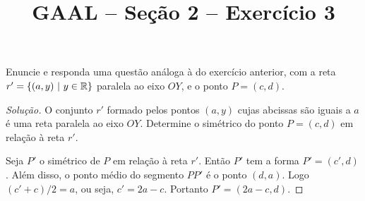 \documentclass[a4paper,11pt]{article}
\title{GAAL -- Seção 2 -- Exercício 3}
\author{\empty}
\date{\empty}
\newcommand\onlyinsubfileone\maketitle
\begin{document}
\onlyinsubfileone

\begin{exercicio-gaal}[E3.S2]
  Enuncie e responda uma questão análoga à do exercício anterior, com a reta $r' = \{(a,y) \ | \ y \in \mathbb{R}\}$ paralela ao eixo $OY$, e o ponto $P = (c,d)$.
\end{exercicio-gaal}

\begin{proof}[Solução]
  O conjunto $r'$ formado pelos pontos $(a,y)$ cujas abcissas são iguais a $a$ é uma reta paralela ao eixo $OY$.
  Determine o simétrico do ponto $P = (c,d)$ em relação à reta $r'$.

  Seja $P'$ o simétrico de $P$ em relação à reta $r'$.
  Então $P'$ tem a forma $P' = (c',d)$.
  Além disso, o ponto médio do segmento $PP'$ é o ponto $(d,a)$.
  Logo $(c'+c)/2 = a$, ou seja, $c' = 2a-c$.
  Portanto $P' = (2a-c,d)$.
\end{proof}
\end{document}

